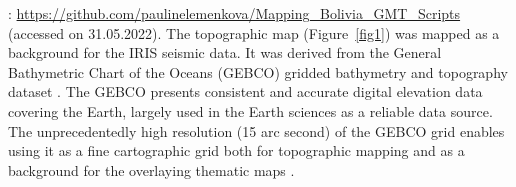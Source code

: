 \documentclass[data,article,accept,pdftex,moreauthors]{Definitions/mdpi}
\begin{document}
: \url{https://github.com/paulinelemenkova/Mapping\_Bolivia\_GMT\_Scripts} (accessed on 31.05.2022).
The topographic map (Figure~\ref{fig1})
 was mapped as a background {for the} IRIS seismic data. {It was derived} from {the} General Bathymetric Chart of the Oceans (GEBCO) gridded bathymetry and topography dataset \cite{Schenke2016}. {The} GEBCO presents consistent and accurate digital elevation data covering the Earth{,} largely used in {the} Earth sciences {as a} reliable data source. The unprecedentedly high resolution (15 arc second) of {the} GEBCO grid enables using it as a fine cartographic grid both for topographic mapping and as a background for {the} overlaying thematic maps \cite{Lemenkova2020b}{.} 
\end{document}
